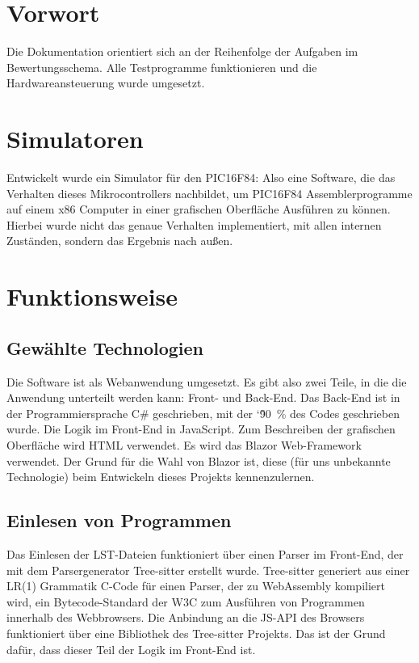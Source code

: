 \section{Vorwort}
Die Dokumentation orientiert sich an der Reihenfolge der Aufgaben im Bewertungsschema.
Alle Testprogramme funktionieren und die Hardwareansteuerung wurde umgesetzt.



\section{Simulatoren}
Entwickelt wurde ein Simulator für den PIC16F84:
Also eine Software, die das Verhalten dieses Mikrocontrollers nachbildet,
um PIC16F84 Assemblerprogramme auf einem x86 Computer in einer grafischen Oberfläche Ausführen zu können.
Hierbei wurde nicht das genaue Verhalten implementiert, mit allen internen Zuständen,
sondern das Ergebnis nach außen.



\section{Funktionsweise}

\subsection{Gewählte Technologien}
Die Software ist als Webanwendung umgesetzt.
Es gibt also zwei Teile, in die die Anwendung unterteilt werden kann:
Front- und Back-End.
Das Back-End ist in der Programmiersprache C\# geschrieben, mit der \char`\~90~\% des Codes geschrieben wurde.
Die Logik im Front-End in JavaScript.
Zum Beschreiben der grafischen Oberfläche wird HTML verwendet.
Es wird das Blazor Web-Framework verwendet.
Der Grund für die Wahl von Blazor ist,
diese (für uns unbekannte Technologie) beim Entwickeln dieses Projekts kennenzulernen. 


\subsection{Einlesen von Programmen}
Das Einlesen der LST-Dateien funktioniert über einen Parser im Front-End,
der mit dem Parsergenerator Tree-sitter erstellt wurde.
Tree-sitter generiert aus einer LR(1) Grammatik C-Code für einen Parser,
der zu WebAssembly kompiliert wird, ein Bytecode-Standard der W3C zum Ausführen von Programmen innerhalb des Webbrowsers.
Die Anbindung an die JS-API des Browsers funktioniert über eine 
Bibliothek des Tree-sitter Projekts.
Das ist der Grund dafür, dass dieser Teil der Logik im Front-End ist.


